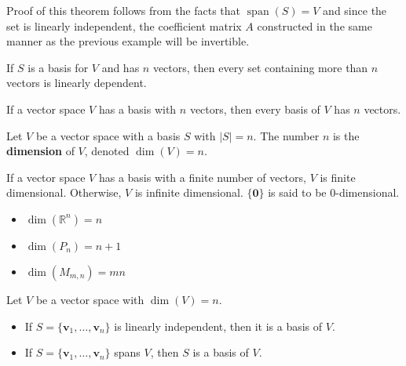 Proof of this theorem follows from the facts that \(\operatorname{span}(S)=V \) and since the set is linearly independent, the coefficient matrix \(A\) constructed in the same manner as the previous example will be invertible.
\begin{theorem}
    If \(S\) is a basis for \(V\) and has \(n\) vectors, then every set containing more than \(n\) vectors is linearly dependent.
\end{theorem}
\begin{theorem}
    If a vector space \(V\) has a basis with \(n\) vectors, then every basis of \(V\) has \(n\) vectors.
\end{theorem}
\begin{definition}
    Let \(V\) be a vector space with a basis \(S\) with \(|S| =n\). The number \(n\) is the \textbf{dimension} of \(V\), denoted \(\dim (V)=n\).
\end{definition}
If a vector space \(V\) has a basis with a finite number of vectors, \(V\) is finite dimensional. Otherwise, \(V\) is infinite dimensional. \(\{ \mathbf{0}  \} \) is said to be 0-dimensional.
\begin{remark}
    \begin{itemize} The following are true.
        \item \(\dim \left( \mathbb{R} ^n \right)=n \) 
        \item \(\dim \left( P_n \right)=n+ 1\) 
        \item \(\dim \left( M_{m,n} \right)=mn \) 
    \end{itemize}
\end{remark}
\begin{theorem}
    Let \(V\) be a vector space with \(\dim (V)=n\).
    \begin{itemize}
        \item If \(S=\{ \mathbf{v} _1,\ldots,\mathbf{v} _n \} \) is linearly independent, then it is a basis of \(V\). 
        \item If \(S=\{ \mathbf{v} _1,\ldots,\mathbf{v} _n \} \) spans \(V\), then \(S\) is a basis of \(V\).
    \end{itemize}
\end{theorem}
